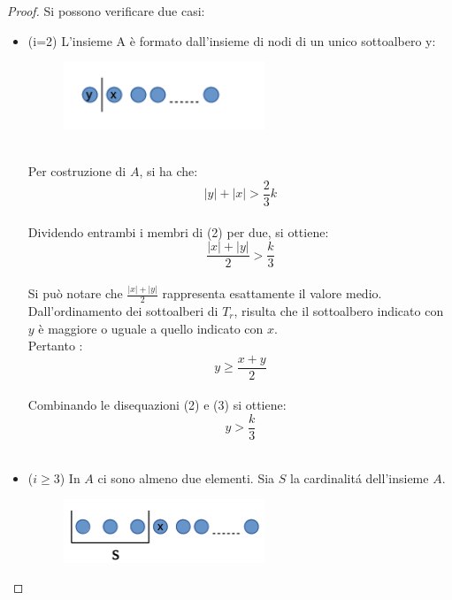 \begin{proof}
	Si possono verificare  due casi:
	\begin{itemize}
		\item (i=2)  L'insieme A \`e formato dall'insieme di nodi di un unico sottoalbero y:
		\begin{figure}[htbp]
			\centering
			\includegraphics[width=6cm]{capitolo3/4}
			\caption{}
		\end{figure}\\
		Per costruzione di $ A $, si ha che:
		\\
		\begin{equation}
			\label{dis1}
			|y| + |x| > \frac{2}{3}k
		\end{equation}
		\\
		Dividendo entrambi i membri di (2) per  due, si ottiene:
		\\
		\begin{equation}
			\frac{ |x| + |y| }{2} > \frac{k}{3}  
		\end{equation}
		\\
		Si pu\`o notare che $\frac{ |x| + |y| }{2} $ rappresenta esattamente il valore medio. \\
		Dall'ordinamento dei sottoalberi di $T_r$, risulta che il sottoalbero indicato con $ y $ \`e maggiore o uguale a quello indicato con $ x $.\\
		Pertanto :
		\\
		\begin{equation}
			y \ge \frac{ x + y }{2} 
		\end{equation}
		\\
		Combinando le disequazioni (2) e (3) si ottiene:
		\\
		\begin{equation*}
			y > \frac{k}{3}  
		\end{equation*}
		\\
		\item ($i\ge3$) In $ A $ ci sono almeno due elementi. Sia $ S $ la cardinalit\'a dell'insieme $ A $.
		
		\begin{figure}[htbp]
			\centering
			\includegraphics[width=6cm]{capitolo3/5}
			\caption{}
		\end{figure}
	

\end{itemize}
\end{proof}
